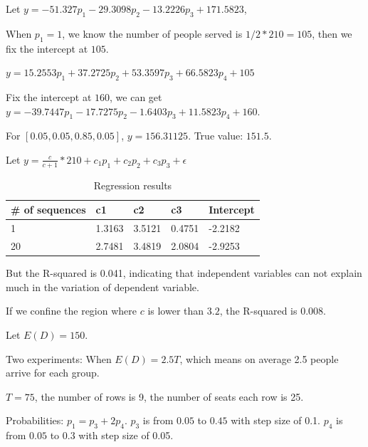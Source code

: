 Let $y = -51.327 p_1 - 29.3098 p_2 - 13.2226 p_3 + 171.5823$, 

When $p_1 =1$, we know the number of people served is $1/2 * 210 = 105$, then we fix the intercept at $105$.

$y = 15.2553 p_1 + 37.2725 p_2 + 53.3597 p_3 + 66.5823 p_4 + 105$

Fix the intercept at $160$, we can get $y = -39.7447 p_1 - 17.7275 p_2 - 1.6403 p_3 + 11.5823 p_4 + 160$.

For $[0.05, 0.05, 0.85, 0.05]$, $y = 156.31125$. True value: $151.5$.

Let $y = \frac{c}{c+1} * 210 + c_1 p_1 + c_2 p_2 + c_3 p_3 + \epsilon$

\begin{table}[ht]
  \centering
  \caption{Regression results}
  \begin{tabular}{|l|l|l|l|l|}
  \hline
  \# of sequences & c1 & c2 & c3 & Intercept \\
  \hline
  1  & 1.3163 & 3.5121 & 0.4751 & -2.2182 \\
  20 & 2.7481 & 3.4819 & 2.0804 & -2.9253 \\
  \hline
  \end{tabular}
\end{table}

But the R-squared is 0.041, indicating that independent variables can not explain much in the variation of dependent variable.

If we confine the region where $c$ is lower than $3.2$, the R-squared is 0.008. 








\newpage

Let $E(D) = 150$.

Two experiments:
When $E(D) = 2.5T$, which means on average 2.5 people arrive for each group.

$T =75$, the number of rows is 9, the number of seats each row is 25.

Probabilities: 
$p_1 = p_3 + 2p_4$. $p_3$ is from $0.05$ to $0.45$ with step size of 0.1. $p_4$ is from $0.05$ to $0.3$ with step size of 0.05.


